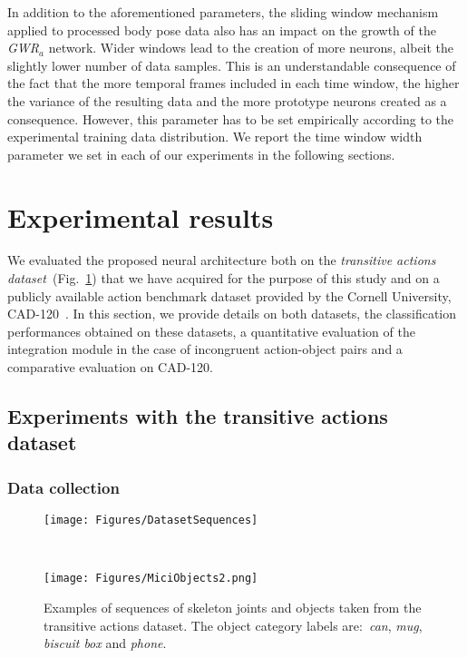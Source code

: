 \documentclass[5p,times]{elsarticle}
\begin{document}
In addition to the aforementioned parameters, the sliding window mechanism applied to processed body pose data also has an impact on the growth of the \textit{GWR}$_a$ network.
Wider windows lead to the creation of more neurons, albeit the slightly lower number of data samples.
This is an understandable consequence of the fact that the more temporal frames included in each time window, the higher the variance of the resulting data and the more prototype neurons created as a consequence.
However, this parameter has to be set empirically according to the experimental training data distribution.
We report the time window width parameter we set in each of our experiments in the following sections. 

\section{Experimental results}\label{sec:results}

We evaluated the proposed neural architecture both on the \textit{transitive actions dataset}~(Fig.~\ref{fig:mici_dataset}) that we have acquired for the purpose of this study and on a publicly available action benchmark dataset provided by the Cornell University, CAD-120~\cite{koppula2013learning}.
In this section, we provide details on both datasets, the classification performances obtained on these datasets, a quantitative evaluation of the integration module in the case of incongruent action-object pairs and a comparative evaluation on CAD-120.

\subsection{Experiments with the transitive actions dataset}
\subsubsection{Data collection}\label{subsection:collection}

\begin{figure}
\centering
\begin{minipage}[b]{.85\linewidth}
\centering\texttt{[image: Figures/DatasetSequences]}
\label{fig:dataset}
\end{minipage} \\
\begin{minipage}[b]{.6\linewidth}
\centering
\texttt{[image: Figures/MiciObjects2.png]}
\label{fig:mici_objects}
\end{minipage}
\caption{Examples of sequences of skeleton joints and objects taken from the transitive actions dataset. The object category labels are:~\textit{can}, \textit{mug}, \textit{biscuit box} and \textit{phone}.}\label{fig:mici_dataset}
\end{figure}
\end{document}
